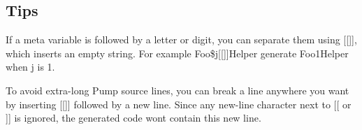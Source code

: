 \subsection*{Tips}


\begin{DoxyItemize}
\item If a meta variable is followed by a letter or digit, you can separate them using {\ttfamily \mbox{[}\mbox{[}\mbox{]}\mbox{]}}, which inserts an empty string. For example {\ttfamily Foo\$j\mbox{[}\mbox{[}\mbox{]}\mbox{]}Helper} generate {\ttfamily Foo1\+Helper} when {\ttfamily j} is 1.
\item To avoid extra-\/long Pump source lines, you can break a line anywhere you want by inserting {\ttfamily \mbox{[}\mbox{[}\mbox{]}\mbox{]}} followed by a new line. Since any new-\/line character next to {\ttfamily \mbox{[}\mbox{[}} or {\ttfamily \mbox{]}\mbox{]}} is ignored, the generated code won\textquotesingle{}t contain this new line. 
\end{DoxyItemize}